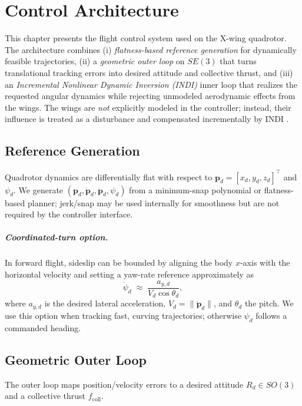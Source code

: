 
\chapter{Control Architecture}\label{chapter:control-architecture}

This chapter presents the flight control system used on the X-wing quadrotor.
The architecture combines (i) \emph{flatness-based reference generation} for dynamically
feasible trajectories, (ii) a \emph{geometric outer loop} on $SE(3)$ that turns
translational tracking errors into desired attitude and collective thrust, and
(iii) an \emph{Incremental Nonlinear Dynamic Inversion (INDI)} inner loop that
realizes the requested angular dynamics while rejecting unmodeled aerodynamic
effects from the wings.
The wings are \emph{not} explicitly modeled in the controller; instead, their influence
is treated as a disturbance and compensated incrementally by INDI
\cite{Smeur2016,Oosedo2017,vanKampen2018,Tzoumanikas2021}.

\section{Reference Generation}\label{sec:ref-gen}
Quadrotor dynamics are differentially flat with respect to
$\mathbf{p}_d=[x_d,y_d,z_d]^\top$ and $\psi_d$.
We generate $(\mathbf{p}_d,\dot{\mathbf{p}}_d,\ddot{\mathbf{p}}_d,\psi_d)$
from a minimum-snap polynomial or flatness-based planner; jerk/snap may be used internally
for smoothness but are not required by the controller interface.

\paragraph{Coordinated-turn option.}
In forward flight, sideslip can be bounded by aligning the body $x$-axis with the
horizontal velocity and setting a yaw-rate reference approximately as
\begin{equation}
\dot{\psi}_d \;\approx\; \frac{a_{y,d}}{V_d\cos\theta_d},
\end{equation}
where $a_{y,d}$ is the desired lateral acceleration, $V_d=\|\dot{\mathbf{p}}_d\|$, and
$\theta_d$ the pitch. We use this option when tracking fast, curving
trajectories; otherwise $\psi_d$ follows a commanded heading.

\section{Geometric Outer Loop}\label{sec:outer}
The outer loop maps position/velocity errors to a desired attitude $R_d\in SO(3)$
and a collective thrust $f_{\text{coll}}$.

